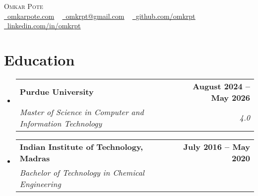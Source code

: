 \documentclass[letterpaper,11pt]{article}
\makeatletter
\newcommand{\resumeSubheading}[4]{
  \vspace{-2pt}\item
    \begin{tabular*}{1.0\textwidth}[t]{l@{\extracolsep{\fill}}r}
      \textbf{#1} & \textbf{\small #2} \\
      \textit{\small#3} & \textit{\small #4} \\
    \end{tabular*}\vspace{-7pt}
}
\newcommand{\resumeSubHeadingListStart}{\begin{itemize}[leftmargin=0.0in, label={}]}
\newcommand{\resumeSubHeadingListEnd}{\end{itemize}}
\makeatother
\begin{document}

\begin{center}
    {\vspace*{30pt} \Huge \scshape Omkar Pote} \\ \vspace{5pt} 
    \small
    \href{https://omkarpote.com}{\raisebox{-0.2\height}\faGlobe\  \underline{omkarpote.com}} ~ 
    \href{mailto:omkrpt@gmail.com}{\raisebox{-0.2\height}\faEnvelope\  \underline{omkrpt@gmail.com}} ~
    \href{https://github.com/omkrpt}{\raisebox{-0.2\height}\faGithub\ \underline{github.com/omkrpt}} ~ 
    \href{https://linkedin.com/in/omkrpt/}{\raisebox{-0.2\height}\faLinkedin\ \underline{linkedin.com/in/omkrpt}}
    \vspace{-8pt}
\end{center}


\section{Education}
  \resumeSubHeadingListStart
    \resumeSubheading
      {Purdue University}{August 2024 -- May 2026}
      {Master of Science in Computer and Information Technology}{4.0}
    \resumeSubheading
      {Indian Institute of Technology, Madras}{July 2016 -- May 2020}
      {Bachelor of Technology in Chemical Engineering}{}
  \resumeSubHeadingListEnd

\end{document}
